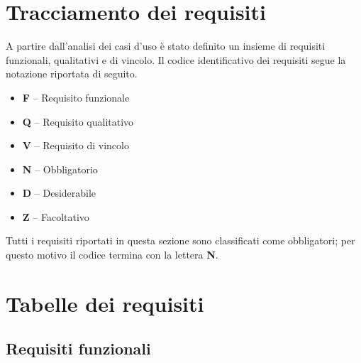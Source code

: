 \newpage

\section{Tracciamento dei requisiti}

A partire dall'analisi dei casi d'uso è stato definito un insieme di requisiti funzionali, qualitativi e di vincolo. Il codice identificativo dei requisiti segue la notazione riportata di seguito.

\begin{itemize}
    \item \textbf{F} -- Requisito funzionale
    \item \textbf{Q} -- Requisito qualitativo
    \item \textbf{V} -- Requisito di vincolo
    \item \textbf{N} -- Obbligatorio
    \item \textbf{D} -- Desiderabile
    \item \textbf{Z} -- Facoltativo
\end{itemize}

Tutti i requisiti riportati in questa sezione sono classificati come obbligatori; per questo motivo il codice termina con la lettera \textbf{N}.

\section{Tabelle dei requisiti}

\subsection{Requisiti funzionali}

